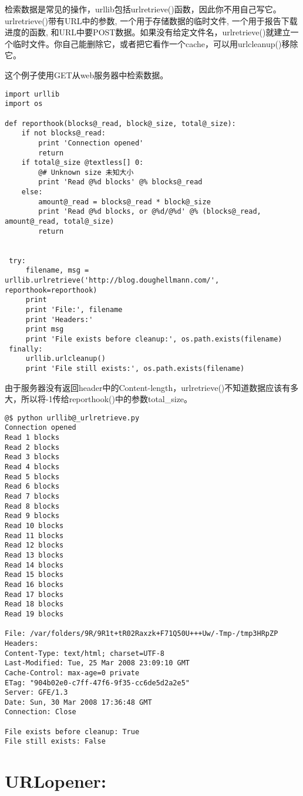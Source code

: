 \documentclass[a4paper,10pt,english]{manual}
\begin{document}
检索数据是常见的操作，urllib包括urlretrieve()函数，因此你不用自己写它。urlretrieve()带有URL中的参数, 一个用于存储数据的临时文件, 一个用于报告下载进度的函数, 和URL中要POST数据。如果没有给定文件名，urlretrieve()就建立一个临时文件。你自己能删除它，或者把它看作一个cache，可以用urlcleanup()移除它。

这个例子使用GET从web服务器中检索数据。

\begin{Verbatim}[commandchars=@\[\]]
import urllib
import os

def reporthook(blocks@_read, block@_size, total@_size):
    if not blocks@_read:
        print 'Connection opened'
        return
    if total@_size @textless[] 0:
        @# Unknown size 未知大小
        print 'Read @%d blocks' @% blocks@_read
    else:
        amount@_read = blocks@_read * block@_size
        print 'Read @%d blocks, or @%d/@%d' @% (blocks@_read, amount@_read, total@_size)
        return


 try:
     filename, msg = urllib.urlretrieve('http://blog.doughellmann.com/', reporthook=reporthook)
     print
     print 'File:', filename
     print 'Headers:'
     print msg
     print 'File exists before cleanup:', os.path.exists(filename)
 finally:
     urllib.urlcleanup()
     print 'File still exists:', os.path.exists(filename)
\end{Verbatim}

由于服务器没有返回header中的Content-length，urlretrieve()不知道数据应该有多大，所以将-1传给reporthook()中的参数total\_size。

\begin{Verbatim}[commandchars=@\[\]]
@$ python urllib@_urlretrieve.py
Connection opened
Read 1 blocks
Read 2 blocks
Read 3 blocks
Read 4 blocks
Read 5 blocks
Read 6 blocks
Read 7 blocks
Read 8 blocks
Read 9 blocks
Read 10 blocks
Read 11 blocks
Read 12 blocks
Read 13 blocks
Read 14 blocks
Read 15 blocks
Read 16 blocks
Read 17 blocks
Read 18 blocks
Read 19 blocks

File: /var/folders/9R/9R1t+tR02Raxzk+F71Q50U+++Uw/-Tmp-/tmp3HRpZP
Headers:
Content-Type: text/html; charset=UTF-8
Last-Modified: Tue, 25 Mar 2008 23:09:10 GMT
Cache-Control: max-age=0 private
ETag: "904b02e0-c7ff-47f6-9f35-cc6de5d2a2e5"
Server: GFE/1.3
Date: Sun, 30 Mar 2008 17:36:48 GMT
Connection: Close

File exists before cleanup: True
File still exists: False
\end{Verbatim}


\section{URLopener:}
\end{document}
